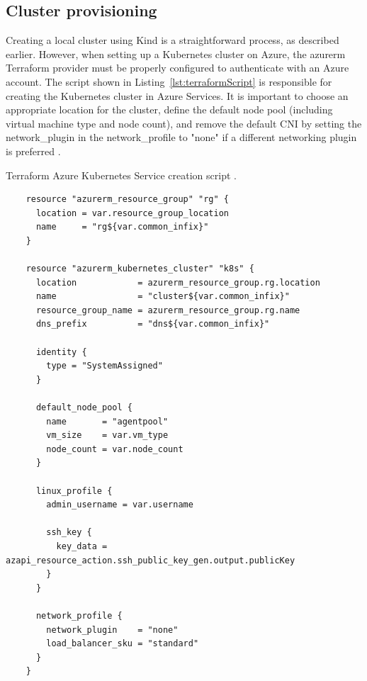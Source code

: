 \subsection{Cluster provisioning}
\label{sec:clusterProvisioning}

Creating a local cluster using Kind is a straightforward process, as described earlier. However, when setting up a Kubernetes cluster on Azure, the azurerm Terraform provider must be properly configured to authenticate with an Azure account. The script shown in Listing~\ref{lst:terraformScript} is responsible for creating the Kubernetes cluster in Azure Services. It is important to choose an appropriate location for the cluster, define the default node pool (including virtual machine type and node count), and remove the default CNI by setting the network\_plugin in the network\_profile to "none" if a different networking plugin is preferred \cite{AKS}.

\begin{listing}[htb]
  \centering
  \caption{Terraform Azure Kubernetes Service creation script \cite{AKS}.}
  \begin{verbatim}
    resource "azurerm_resource_group" "rg" {
      location = var.resource_group_location
      name     = "rg${var.common_infix}"
    }

    resource "azurerm_kubernetes_cluster" "k8s" {
      location            = azurerm_resource_group.rg.location
      name                = "cluster${var.common_infix}"
      resource_group_name = azurerm_resource_group.rg.name
      dns_prefix          = "dns${var.common_infix}"

      identity {
        type = "SystemAssigned"
      }

      default_node_pool {
        name       = "agentpool"
        vm_size    = var.vm_type
        node_count = var.node_count
      }

      linux_profile {
        admin_username = var.username

        ssh_key {
          key_data = azapi_resource_action.ssh_public_key_gen.output.publicKey
        }
      }

      network_profile {
        network_plugin    = "none"
        load_balancer_sku = "standard"
      }
    }
  \end{verbatim}
  \label{lst:terraformScript}
\end{listing}


